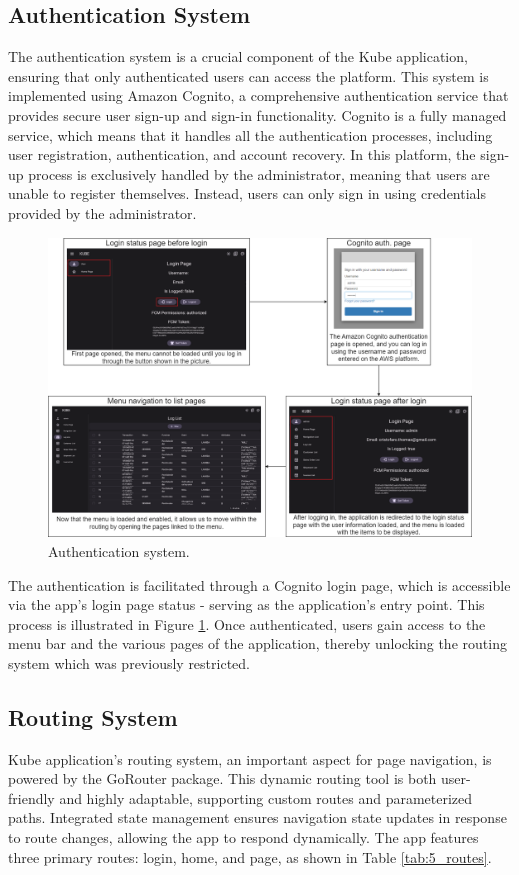 \subsection{Authentication System}
The authentication system is a crucial component of the Kube application, ensuring that only
authenticated users can access the platform. This system is implemented using Amazon Cognito, a
comprehensive authentication service that provides secure user sign-up and sign-in functionality.
Cognito is a fully managed service, which means that it handles all the authentication processes,
including user registration, authentication, and account recovery.
In this platform, the sign-up process is exclusively handled by the administrator, meaning that
users are unable to register themselves. Instead, users can only sign in using credentials provided
by the administrator.

\begin{figure}
    \centering
    \includegraphics[scale=0.33]{Pictures/5_auth.png}
    \caption{Authentication system.}
    \label{fig:5_auth}
\end{figure}

The authentication is facilitated through a Cognito login page, which is
accessible via the app's login page status - serving as the application's entry point. This process
is illustrated in Figure \ref{fig:5_auth}. Once authenticated, users gain access to the menu bar and
the various pages of the application, thereby unlocking the routing system which was previously
restricted.

\subsection{Routing System}
Kube application's routing system, an important aspect for page navigation, is powered by the
GoRouter package. This dynamic routing tool is both user-friendly and highly adaptable, supporting
custom routes and parameterized paths. Integrated state management ensures navigation state updates
in response to route changes, allowing the app to respond dynamically. The app features three
primary routes: login, home, and page, as shown in Table \ref{tab:5_routes}.

